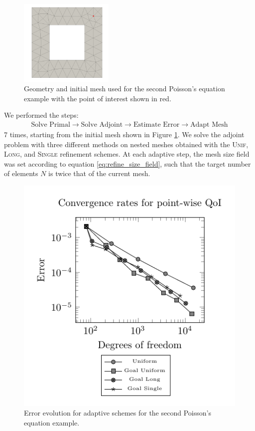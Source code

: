 %
\begin{figure}[ht!]
\centering
\includegraphics[width=0.4\textwidth]{img/refine_squarehole_initial.png}
\caption{Geometry and initial mesh used for the second Poisson's
equation example with the point of interest shown in red.}
\label{fig:refine_poisson2_geom}
\end{figure}

We performed the steps:
\begin{gather*}
\text{Solve Primal} \rightarrow \text{Solve Adjoint} \rightarrow
\text{Estimate Error} \rightarrow \text{Adapt Mesh}
\end{gather*}
7 times, starting from the initial mesh shown in Figure
\ref{fig:refine_poisson2_geom}. We solve the adjoint problem with
three different methods on nested meshes obtained with the
\textsc{Unif}, \textsc{Long}, and \textsc{Single} refinement
schemes. At each adaptive step, the mesh size field was set
according to equation \eqref{eq:refine_size_field}, such that
the target number of elements $N$ is twice that of the current
mesh.

%
\begin{figure}[ht!]
\centering
\includegraphics[width=.5\linewidth]{img/refine_squarehole_convergence.pdf}
\caption{Error evolution for adaptive schemes for the second Poisson's equation
example.}
\label{fig:squarehole_convergence}
\end{figure}

